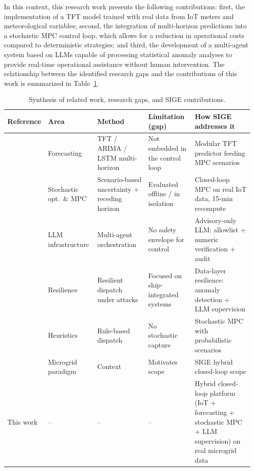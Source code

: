 \documentclass[journal,article,submit,pdftex,moreauthors]{Definitions/mdpi}
\begin{document}
In this context, this research work presents the following contributions: first, the implementation of a TFT model trained with real data from IoT meters and meteorological variables; second, the integration of multi-horizon predictions into a stochastic MPC control loop, which allows for a reduction in operational costs compared to deterministic strategies; and third, the development of a multi-agent system based on LLMs capable of processing statistical anomaly analyses to provide real-time operational assistance without human intervention. The relationship between the identified research gaps and the contributions of this work is summarized in Table~\ref{tab:related}.

\begin{table}[H]
\centering
\caption{Synthesis of related work, research gaps, and SIGE contributions.}
\label{tab:related}
\begin{tabularx}{\textwidth}{p{2.2cm}p{1.7cm}p{2.5cm}p{2.5cm}X}
\toprule
\textbf{Reference} & \textbf{Area} & \textbf{Method} & \textbf{Limitation (gap)} & \textbf{How SIGE addresses it} \\
\midrule
\cite{ref-lim,ref-rao,ref-tasmant} & Forecasting & TFT / ARIMA / LSTM multi-horizon & Not embedded in the control loop & Modular TFT predictor feeding MPC scenarios \\
\cite{ref-birge,ref-rawlings,Parisio2014,Su2014,Zia2018,Hua2019} & Stochastic opt.\ \& MPC & Scenario-based uncertainty + receding horizon & Evaluated offline / in isolation & Closed-loop MPC on real IoT data, 15-min recompute \\
\cite{ref-lami,ref-chase} & LLM infrastructure & Multi-agent orchestration & No safety envelope for control & Advisory-only LLM: allowlist + numeric verification + audit \\
\cite{Han2026} & Resilience & Resilient dispatch under attacks & Focused on ship-integrated systems & Data-layer resilience: anomaly detection + LLM supervision \\
\cite{ref-carrasco} & Heuristics & Rule-based dispatch & No stochastic capture & Stochastic MPC with probabilistic scenarios \\
\cite{ref-alternar} & Microgrid paradigm & Context & Motivates scope & SIGE hybrid closed-loop scope \\
\midrule
This work & -- & -- & -- & Hybrid closed-loop platform (IoT + forecasting + stochastic MPC + LLM supervision) on real microgrid data \\
\bottomrule
\end{tabularx}
\end{table}
\end{document}
